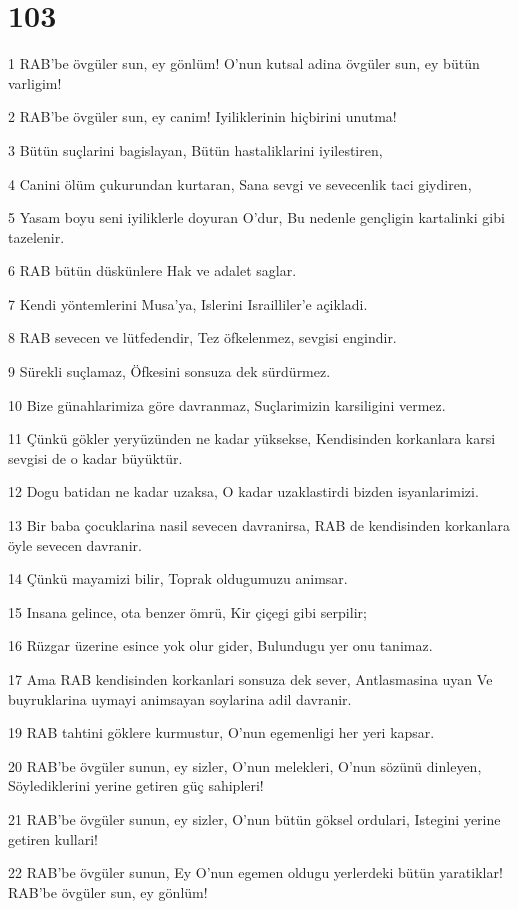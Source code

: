 \chapter{103}

\par 1 RAB'be övgüler sun, ey gönlüm! O'nun kutsal adina övgüler sun, ey bütün varligim!
\par 2 RAB'be övgüler sun, ey canim! Iyiliklerinin hiçbirini unutma!
\par 3 Bütün suçlarini bagislayan, Bütün hastaliklarini iyilestiren,
\par 4 Canini ölüm çukurundan kurtaran, Sana sevgi ve sevecenlik taci giydiren,
\par 5 Yasam boyu seni iyiliklerle doyuran O'dur, Bu nedenle gençligin kartalinki gibi tazelenir.
\par 6 RAB bütün düskünlere Hak ve adalet saglar.
\par 7 Kendi yöntemlerini Musa'ya, Islerini Israilliler'e açikladi.
\par 8 RAB sevecen ve lütfedendir, Tez öfkelenmez, sevgisi engindir.
\par 9 Sürekli suçlamaz, Öfkesini sonsuza dek sürdürmez.
\par 10 Bize günahlarimiza göre davranmaz, Suçlarimizin karsiligini vermez.
\par 11 Çünkü gökler yeryüzünden ne kadar yüksekse, Kendisinden korkanlara karsi sevgisi de o kadar büyüktür.
\par 12 Dogu batidan ne kadar uzaksa, O kadar uzaklastirdi bizden isyanlarimizi.
\par 13 Bir baba çocuklarina nasil sevecen davranirsa, RAB de kendisinden korkanlara öyle sevecen davranir.
\par 14 Çünkü mayamizi bilir, Toprak oldugumuzu animsar.
\par 15 Insana gelince, ota benzer ömrü, Kir çiçegi gibi serpilir;
\par 16 Rüzgar üzerine esince yok olur gider, Bulundugu yer onu tanimaz.
\par 17 Ama RAB kendisinden korkanlari sonsuza dek sever, Antlasmasina uyan Ve buyruklarina uymayi animsayan soylarina adil davranir.
\par 19 RAB tahtini göklere kurmustur, O'nun egemenligi her yeri kapsar.
\par 20 RAB'be övgüler sunun, ey sizler, O'nun melekleri, O'nun sözünü dinleyen, Söylediklerini yerine getiren güç sahipleri!
\par 21 RAB'be övgüler sunun, ey sizler, O'nun bütün göksel ordulari, Istegini yerine getiren kullari!
\par 22 RAB'be övgüler sunun, Ey O'nun egemen oldugu yerlerdeki bütün yaratiklar! RAB'be övgüler sun, ey gönlüm!

